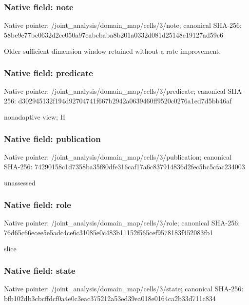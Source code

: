 \documentclass[10pt,a4paper]{article}
\begin{document}
\subsubsection{Native field: note}
Native pointer: /joint\_\allowbreak{}analysis/domain\_\allowbreak{}map/cells/3/note; canonical SHA-256: 58be9e77bc0632d2cc050a97eabcbaba8b201a0332d081d25148e19127ad59c6

\begingroup\raggedright\sloppy Older sufficient-dimension window retained without a rate improvement.\par\endgroup

\subsubsection{Native field: predicate}
Native pointer: /joint\_\allowbreak{}analysis/domain\_\allowbreak{}map/cells/3/predicate; canonical SHA-256: d302945132f194d92704741f667b2942a0639460ff9520c0276a1ed7d5bb46af

\begingroup\raggedright\sloppy nonadaptive view;\allowbreak{} H\par\endgroup

\subsubsection{Native field: publication}
Native pointer: /joint\_\allowbreak{}analysis/domain\_\allowbreak{}map/cells/3/publication; canonical SHA-256: 74290158c1d7358ba35f80dfe316caf17a6c837914836d2fec5bc5cfac234003

\begingroup\raggedright\sloppy unassessed\par\endgroup

\subsubsection{Native field: role}
Native pointer: /joint\_\allowbreak{}analysis/domain\_\allowbreak{}map/cells/3/role; canonical SHA-256: 76d65c66ecee5e5adc4ce6c31085e0c483b11152f565cef9578183f452083fb1

\begingroup\raggedright\sloppy slice\par\endgroup

\subsubsection{Native field: state}
Native pointer: /joint\_\allowbreak{}analysis/domain\_\allowbreak{}map/cells/3/state; canonical SHA-256: bfb102db3cbcffdcf0a4e0c3eac375212a53ed39ea018e0164ca2b33d711c834
\end{document}
